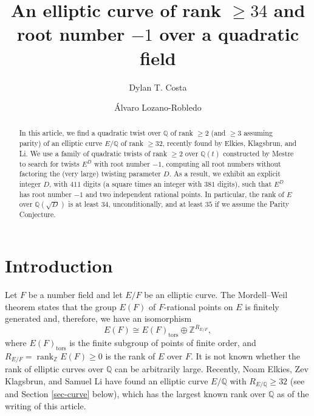 \documentclass[11pt]{amsart}
\newcommand{\Q}{\mathbb Q}
\newcommand{\Z}{\mathbb Z}
\DeclareMathOperator{\rank}{rank}
\begin{document}

\title[A rank $\geq 34$ curve over a quadratic field]{An elliptic curve of rank $\geq 34$ and root number $-1$ over a quadratic field}

\author{Dylan T. Costa}
\address{University of Connecticut, Department of Mathematics, Storrs, CT 06269, USA}

\author{\'Alvaro Lozano-Robledo}
\address{University of Connecticut, Department of Mathematics, Storrs, CT 06269, USA}


\begin{abstract}
In this article, we find a quadratic twist over $\Q$ of rank  $\geq 2$ (and $\geq 3$ assuming parity) of an elliptic curve $E/\Q$ of rank $\geq 32$, recently found by Elkies, Klagsbrun, and Li. We use a family of quadratic twists of rank $\geq 2$ over $\Q(t)$ constructed by Mestre to search for twists $E^D$ with root number $-1$, computing all root numbers without factoring the (very large) twisting parameter $D$. As a result, we exhibit an explicit integer $D$, with $411$ digits (a square times an integer with $381$ digits), such that $E^D$ has root number $-1$ and two independent rational points. In particular, the rank of $E$ over $\Q(\sqrt{D})$ is at least $34$, unconditionally, and at least $35$ if we assume the Parity Conjecture.
\end{abstract}

\maketitle

\section{Introduction}\label{sec-intro}

Let $F$ be a number field and let $E/F$ be an elliptic curve. The Mordell--Weil theorem states that the group $E(F)$ of $F$-rational points on $E$ is finitely generated and, therefore, we have an isomorphism
$$E(F)\cong E(F)_\text{tors}\oplus \Z^{R_{E/F}},$$
where $E(F)_\text{tors}$ is the finite subgroup of points of finite order, and $R_{E/F}=\rank_\Z E(F)\geq 0$ is the rank of $E$ over $F$. It is not known whether the rank of elliptic curves over $\Q$ can be arbitrarily large. Recently, Noam Elkies, Zev Klagsbrun, and Samuel Li have found an elliptic curve $E/\Q$ with $R_{E/\Q}\geq 32$ (see \cite{icarm} and Section \ref{sec-curve} below), which has the largest known rank over $\Q$ as of the writing of this article.
\end{document}
